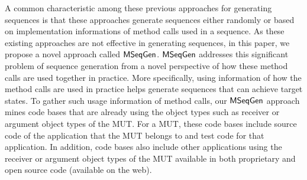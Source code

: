\documentclass{sig-alternate}
\begin{document}
A common characteristic among these previous approaches for generating sequences is that these approaches generate sequences either randomly or based on implementation informations of method calls used in a sequence. As these existing approaches are not effective in generating sequences, in this paper, we propose a novel approach called $\textsf{MSeqGen} $. $\textsf{MSeqGen} $ addresses this significant problem of sequence generation from a novel perspective of how these method calls are used together in practice. More specifically, using information of how the method calls are used in practice helps generate sequences that can achieve target states. To gather such usage information of method calls, our $\textsf{MSeqGen} $ approach mines code bases that are already using the object types such as receiver or argument object types of the MUT. For a MUT, these code bases include source code of the application that the MUT belongs to and test code for that application. In addition, code bases also include other applications using the receiver or argument object types of the MUT available in both proprietary and open source code (available on the web). 
\end{document}
